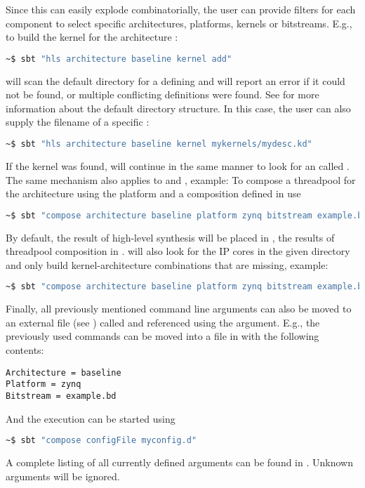 \medskip
Since this can easily explode combinatorially, the user can provide filters for each component to select specific architectures, platforms, kernels or bitstreams. E.g., to build the kernel  for the architecture :
%
\begin{lstlisting}[language=bash]
~$ sbt "hls architecture baseline kernel add"
\end{lstlisting}
%
\tapasco{} will scan the default directory  for a  defining  and will report an error if it could not be found, or multiple conflicting definitions were found.
See  for more information about the default directory structure.
In this case, the user can also supply the filename of a specific :
%
\begin{lstlisting}[language=bash]
~$ sbt "hls architecture baseline kernel mykernels/mydesc.kd"
\end{lstlisting}
%
If the kernel was found, \tapasco{} will continue in the same manner to look for an  called .
The same mechanism also applies to  and , example:
To compose a threadpool for the  architecture using the  platform and a composition defined in  use
%
\begin{lstlisting}[language=bash]
~$ sbt "compose architecture baseline platform zynq bitstream example.bd"
\end{lstlisting}
%
By default, the result of high-level synthesis will be placed in , the results of threadpool composition in .
\tapasco{} will also look for the IP cores in the given directory and only build kernel-architecture combinations that are missing, example:
%
\begin{lstlisting}[language=bash]
~$ sbt "compose architecture baseline platform zynq bitstream example.bd coreDir myCores"
\end{lstlisting}
%
Finally, all previously mentioned command line arguments can also be moved to an external file (see ) called and referenced using the  argument.
E.g., the previously used commands can be moved into a file  in \tapascohome{} with the following contents:
%
\begin{lstlisting}[language=run]
Architecture = baseline
Platform = zynq
Bitstream = example.bd
\end{lstlisting}
%
And the execution can be started using
%
\begin{lstlisting}[language=bash]
~$ sbt "compose configFile myconfig.d"
\end{lstlisting}
%
A complete listing of all currently defined arguments can be found in .
Unknown arguments will be ignored.
